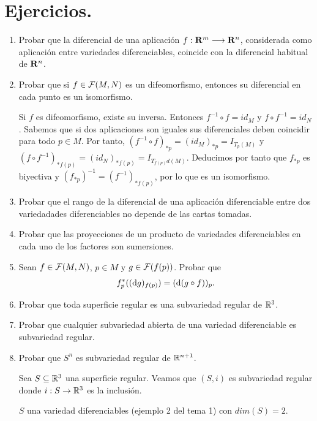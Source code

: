\documentclass[Cursovd_portada.tex]{subfiles}
\begin{document}
\section{Ejercicios.}
\begin{enumerate}
\item Probar que la diferencial de una aplicación $f:{\bf R}^m
\longrightarrow {\bf R}^n$, considerada como aplicación entre
variedades diferenciables, coincide con la diferencial habitual de
${\bf R}^n$.

\item Probar que si $f\in{\cal F}(M,N)$ es un
difeomorfismo, entonces su diferencial en cada punto es un
isomorfismo. 

Si $f$ es difeomorfismo, existe su inversa. Entonces $f^{-1} \circ f = id_M$ y $f \circ f^{-1} = id_N$. Sabemos que si dos aplicaciones son iguales sus diferenciales deben coincidir para todo $p \in M$. Por tanto, $(f^{-1}\circ f)_{\ast p} = (id_M)_{\ast p} = I_{T_p(M)}$ y  $(f\circ f^{-1})_{\ast f(p)} = (id_N)_{\ast f(p)} = I_{T_{f(p)}d(M)}$. Deducimos por tanto que $f_{\ast p}$ es biyectiva y $(f_{\ast p})^{-1} = (f^{-1})_{\ast f(p)}$, por lo que es un isomorfismo.

\item Probar que el rango de la diferencial de una aplicación diferenciable entre dos variedadades diferenciables
no depende de las cartas tomadas. \item Probar que las
proyecciones de un producto de variedades diferenciables en cada
uno de los factores son sumersiones. \item Sean
$f\in{\cal F}(M,N)$, $p\in M$ y $g\in{\cal F}(f(p))$. Probar que
$$f_p^*(({\rm d} g)_{f(p)})=({\rm d} (g\circ f))_p.$$

\item Probar que toda superficie regular es una subvariedad regular de $\mathbb{R}^3$.

\item Probar que cualquier subvariedad abierta de una variedad
diferenciable es subvariedad regular.

\item Probar que $S^n$ es subvariedad regular de $\mathbb{R}^{n+1}$.

\begin{dem}
Sea $S \subseteq \mathbb{R}^3$ una superficie regular. Veamos que $(S,i)$ es subvariedad regular donde $i : S \to \mathbb{R}^3$ es la inclusión.

$S$ una variedad diferenciables (ejemplo 2 del tema 1) con $dim(S)=2$.


\end{dem}
\end{enumerate}
\end{document}
